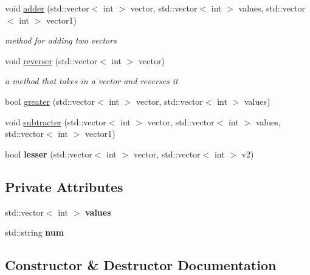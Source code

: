\begin{DoxyCompactItemize}
void \mbox{\hyperlink{class_big_numbers_1_1_big_numbers_a824d0548f48150ceeb4bcf9bc818e7ef}{adder}} (std\+::vector$<$ int $>$ vector, std\+::vector$<$ int $>$ values, std\+::vector$<$ int $>$ vector1)
\begin{DoxyCompactList}\small\item\em method for adding two vectors \end{DoxyCompactList}\item 
void \mbox{\hyperlink{class_big_numbers_1_1_big_numbers_af24675c9a4a5ae6c335d9b4c902e02ee}{reverser}} (std\+::vector$<$ int $>$ vector)
\begin{DoxyCompactList}\small\item\em a method that takes in a vector and reverses it \end{DoxyCompactList}\item 
bool \mbox{\hyperlink{class_big_numbers_1_1_big_numbers_a48e2f552329954eff2e4f1d2425ed511}{greater}} (std\+::vector$<$ int $>$ vector, std\+::vector$<$ int $>$ values)
\item 
void \mbox{\hyperlink{class_big_numbers_1_1_big_numbers_a0a5dfb5ca85f36e40c2c2f068f66d05a}{subtracter}} (std\+::vector$<$ int $>$ vector, std\+::vector$<$ int $>$ values, std\+::vector$<$ int $>$ vector1)
\item 
\mbox{\label{class_big_numbers_1_1_big_numbers_a0484ad3d959ad272b50c6229da2f64c9}} 
bool {\bfseries lesser} (std\+::vector$<$ int $>$ vector, std\+::vector$<$ int $>$ v2)
\end{DoxyCompactItemize}
\subsection*{Private Attributes}
\begin{DoxyCompactItemize}
\item 
\mbox{\label{class_big_numbers_1_1_big_numbers_adbe7d06479f9e3e4d21a37875e8977a5}} 
std\+::vector$<$ int $>$ {\bfseries values}
\item 
\mbox{\label{class_big_numbers_1_1_big_numbers_a2d431ac02832d25cbbdafb8391ef78f3}} 
std\+::string {\bfseries num}
\end{DoxyCompactItemize}


\subsection{Constructor \& Destructor Documentation}
\mbox{\label{class_big_numbers_1_1_big_numbers_a87037d5faa0bf5253b6e8fc7fc54324c}} 
